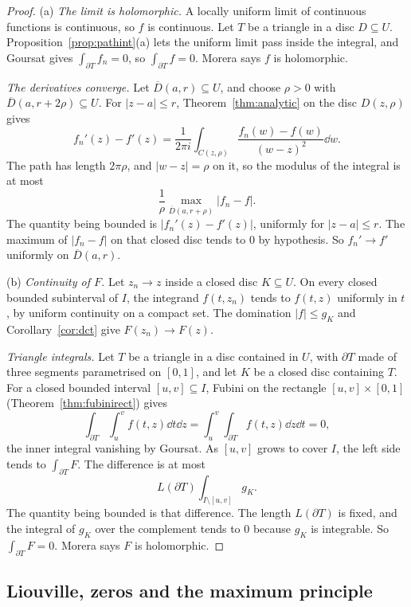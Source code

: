 \begin{proof}
(a) \textit{The limit is holomorphic.} A locally uniform limit of continuous functions is continuous, so $f$ is continuous. Let $T$ be a triangle in a disc $D\subseteq U$. Proposition~\ref{prop:pathint}(a) lets the uniform limit pass inside the integral, and Goursat gives $\int_{\partial T}f_n=0$, so $\int_{\partial T}f=0$. Morera says $f$ is holomorphic.

\textit{The derivatives converge.} Let $\overline D(a,r)\subseteq U$, and choose $\rho>0$ with $\overline D(a,r+2\rho)\subseteq U$. For $|z-a|\le r$, Theorem~\ref{thm:analytic} on the disc $D(z,\rho)$ gives
\[
f_n'(z)-f'(z)=\frac1{2\pi i}\int_{C(z,\rho)}\frac{f_n(w)-f(w)}{(w-z)^2}\dd w.
\]
The path has length $2\pi\rho$, and $|w-z|=\rho$ on it, so the modulus of the integral is at most
\[
\frac1\rho\max_{\overline D(a,r+\rho)}|f_n-f|.
\]
The quantity being bounded is $|f_n'(z)-f'(z)|$, uniformly for $|z-a|\le r$. The maximum of $|f_n-f|$ on that closed disc tends to $0$ by hypothesis. So $f_n'\to f'$ uniformly on $\overline D(a,r)$.

(b) \textit{Continuity of $F$.} Let $z_n\to z$ inside a closed disc $K\subseteq U$. On every closed bounded subinterval of $I$, the integrand $f(t,z_n)$ tends to $f(t,z)$ uniformly in $t$, by uniform continuity on a compact set. The domination $|f|\le g_K$ and Corollary~\ref{cor:dct} give $F(z_n)\to F(z)$.

\textit{Triangle integrals.} Let $T$ be a triangle in a disc contained in $U$, with $\partial T$ made of three segments parametrised on $[0,1]$, and let $K$ be a closed disc containing $T$. For a closed bounded interval $[u,v]\subseteq I$, Fubini on the rectangle $[u,v]\times[0,1]$ (Theorem~\ref{thm:fubinirect}) gives
\[
\int_{\partial T}\int_u^vf(t,z)\dd t\dd z=\int_u^v\int_{\partial T}f(t,z)\dd z\dd t=0,
\]
the inner integral vanishing by Goursat. As $[u,v]$ grows to cover $I$, the left side tends to $\int_{\partial T}F$. The difference is at most
\[
L(\partial T)\int_{I\setminus[u,v]}g_K.
\]
The quantity being bounded is that difference. The length $L(\partial T)$ is fixed, and the integral of $g_K$ over the complement tends to $0$ because $g_K$ is integrable. So $\int_{\partial T}F=0$. Morera says $F$ is holomorphic.
\end{proof}

\subsection*{Liouville, zeros and the maximum principle}

